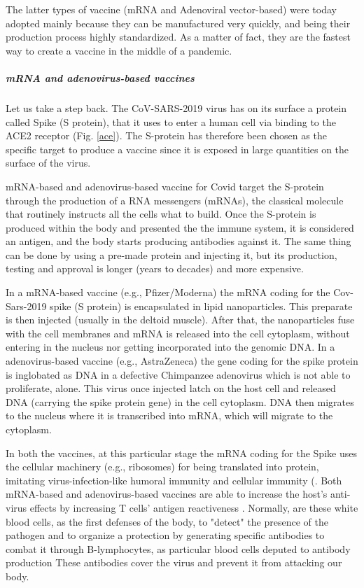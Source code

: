 \documentclass[graybox]{svmult}
\begin{document}
The latter types of vaccine (mRNA and Adenoviral vector-based) were today adopted mainly because they can be manufactured very quickly, and being their production process highly standardized. As a matter of fact, they are the fastest way to create a vaccine in the middle of a pandemic.

\subparagraph{mRNA and adenovirus-based vaccines}
\label{based} 

Let us take a step back. The CoV-SARS-2019 virus has on its surface a protein called Spike (S protein), that it uses to enter a human cell via binding to the ACE2 receptor (Fig. \ref{ace}). The S-protein has therefore been chosen as the specific target to produce a vaccine since it is exposed in large quantities on the surface of the virus.

mRNA-based and adenovirus-based vaccine for Covid target the S-protein through the production of a RNA messengers (mRNAs), the classical molecule that routinely instructs all the cells what to build. Once the S-protein is produced within the body and presented the the immune system, it is considered an antigen, and the body starts producing antibodies against it. The same thing can be done by using a pre-made protein and injecting it, but its production, testing and approval is longer (years to decades) and more expensive.

In a mRNA-based vaccine (e.g., Pfizer/Moderna) the mRNA coding for the Cov-Sars-2019 spike (S protein)  is encapsulated in lipid nanoparticles. This preparate is then injected (usually in the deltoid muscle). After that, the nanoparticles fuse with the cell membranes and mRNA is  released into the cell cytoplasm, without entering in the nucleus nor getting incorporated into the genomic DNA. In a adenovirus-based vaccine (e.g., AstraZeneca) the gene coding for the spike protein is inglobated as DNA in a defective Chimpanzee adenovirus which is not able to proliferate, alone.  This virus once injected latch on the host cell and released DNA (carrying the spike protein gene) in the cell cytoplasm. DNA then migrates to the nucleus where it is transcribed into mRNA, which will migrate to the cytoplasm.

In both the vaccines, at this particular stage the mRNA coding for the Spike uses the cellular machinery (e.g., ribosomes) for being translated into protein, imitating virus-infection-like humoral immunity and cellular immunity (\cite{monslow2020}. Both mRNA-based and adenovirus-based vaccines are able to increase the host’s anti-virus effects by increasing T cells’ antigen reactiveness \cite{wang2021}. Normally, are these white blood cells, as the first defenses of the body, to "detect" the presence of the pathogen and to organize a protection by generating specific antibodies to combat it through B-lymphocytes, as particular blood cells deputed to antibody production \cite{ratajczak2018} These antibodies cover the virus and prevent it from attacking our body. 
\end{document}
